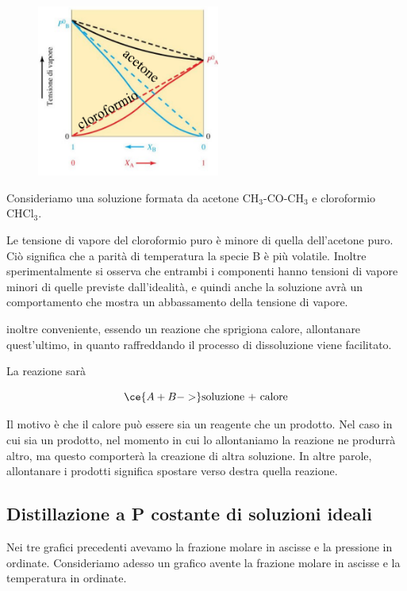 \vspace{-0.2cm}\begin{minipage}{0.4\textwidth}
    \begin{figure}[H]
        \includegraphics[width=6cm]{immagini/tensione_di_vapore_sol_esotermica.png}
    \end{figure}
\end{minipage}
\begin{minipage}{0.6\textwidth}
    Consideriamo una soluzione formata da acetone CH$_3$-CO-CH$_3$ e cloroformio CHCl$_3$.

    Le tensione di vapore del cloroformio puro è minore di quella dell'acetone puro. Ciò significa che a parità di temperatura la specie B è più volatile. Inoltre sperimentalmente si osserva che entrambi i componenti hanno tensioni di vapore minori di quelle previste dall'idealità, e quindi anche la soluzione avrà un comportamento che mostra un abbassamento della tensione di vapore.
\end{minipage}
\E inoltre conveniente, essendo un reazione che sprigiona calore, allontanare quest'ultimo, in quanto raffreddando il processo di dissoluzione viene facilitato.

La reazione sarà

$$\ce{A + B ->} \text{soluzione + calore}$$

Il motivo è che il calore può essere sia un reagente che un prodotto. Nel caso in cui sia un prodotto, nel momento in cui lo allontaniamo la reazione ne produrrà altro, ma questo comporterà la creazione di altra soluzione. In altre parole, allontanare i prodotti significa spostare verso destra quella reazione.
\subsection{Distillazione a P costante di soluzioni ideali}
Nei tre grafici precedenti avevamo la frazione molare in ascisse e la pressione in ordinate. Consideriamo adesso un grafico avente la frazione molare in ascisse e la temperatura in ordinate.


